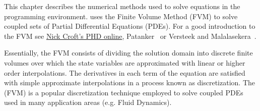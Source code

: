 This chapter describes the numerical methods used to solve equations
in the \FiPy{} programming environment. \FiPy{} uses the Finite Volume
Method (FVM) to solve coupled sets of Partial Differential Equations
(PDEs). For a good introduction to the FVM see
\href{http://www.gre.ac.uk/~ct02/research/thesis/main.html}{Nick
Croft's PHD online}, Patanker~\cite{patanker} or Versteek and
Malalasekera~\cite{versteeg_malalasekera}.

Essentially, the FVM consists of dividing the solution domain into
discrete finite volumes over which the state variables are
approximated with linear or higher order interpolations. The
derivatives in each term of the equation are satisfied with simple
approximate interpolations in a process known as discretization. The
(FVM) is a popular discretization technique employed to solve coupled
PDEs used in many application areas (e.g. Fluid Dynamics).






